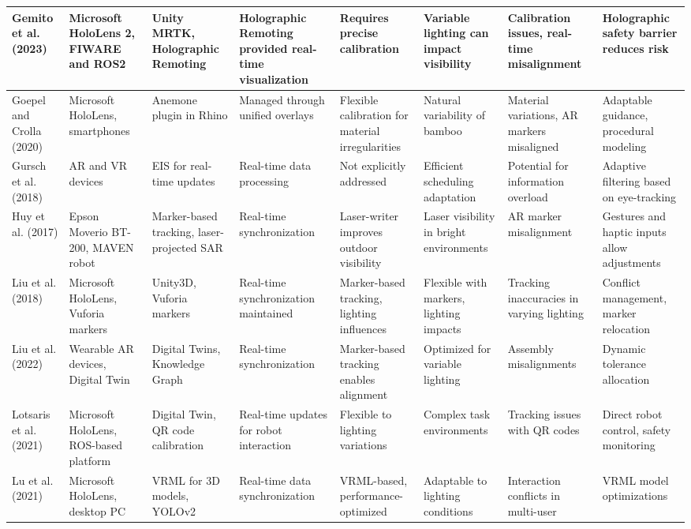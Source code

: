 {\begin{landscape}
\begin{longtable}{@{}p{1.8cm}p{1.8cm}p{1.8cm}p{1.8cm}p{1.8cm}p{1.8cm}p{1.8cm}p{1.8cm}@{}}
\midrule
Gemito et al. (2023) & Microsoft HoloLens 2, FIWARE and ROS2 & Unity MRTK, Holographic Remoting & Holographic Remoting provided real-time visualization & Requires precise calibration & Variable lighting can impact visibility & Calibration issues, real-time misalignment & Holographic safety barrier reduces risk \\
\midrule
Goepel and Crolla (2020) & Microsoft HoloLens, smartphones & Anemone plugin in Rhino & Managed through unified overlays & Flexible calibration for material irregularities & Natural variability of bamboo & Material variations, AR markers misaligned & Adaptable guidance, procedural modeling \\
\midrule
Gursch et al. (2018) & AR and VR devices & EIS for real-time updates & Real-time data processing & Not explicitly addressed & Efficient scheduling adaptation & Potential for information overload & Adaptive filtering based on eye-tracking \\
\midrule
Huy et al. (2017) & Epson Moverio BT-200, MAVEN robot & Marker-based tracking, laser-projected SAR & Real-time synchronization & Laser-writer improves outdoor visibility & Laser visibility in bright environments & AR marker misalignment & Gestures and haptic inputs allow adjustments \\
\midrule
Liu et al. (2018) & Microsoft HoloLens, Vuforia markers & Unity3D, Vuforia markers & Real-time synchronization maintained & Marker-based tracking, lighting influences & Flexible with markers, lighting impacts & Tracking inaccuracies in varying lighting & Conflict management, marker relocation \\
\midrule
Liu et al. (2022) & Wearable AR devices, Digital Twin & Digital Twins, Knowledge Graph & Real-time synchronization & Marker-based tracking enables alignment & Optimized for variable lighting & Assembly misalignments & Dynamic tolerance allocation \\
\midrule
Lotsaris et al. (2021) & Microsoft HoloLens, ROS-based platform & Digital Twin, QR code calibration & Real-time updates for robot interaction & Flexible to lighting variations & Complex task environments & Tracking issues with QR codes & Direct robot control, safety monitoring \\
\midrule
Lu et al. (2021) & Microsoft HoloLens, desktop PC & VRML for 3D models, YOLOv2 & Real-time data synchronization & VRML-based, performance-optimized & Adaptable to lighting conditions & Interaction conflicts in multi-user & VRML model optimizations \\

\end{longtable}
\end{landscape}}
